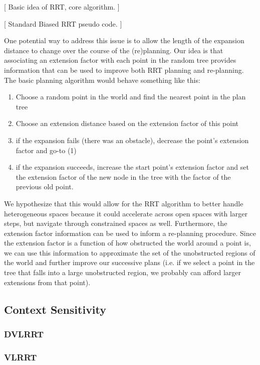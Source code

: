 \documentclass[11pt,twoside,twocolumn]{article}
\begin{document}
[ Basic idea of RRT, core algorithm. ]

[ Standard Biased RRT pseudo code. ]

One potential way to address this issue is to allow the length of the expansion distance to change over the course of the (re)planning. 
Our idea is that associating an extension factor with each point in the random tree provides information that can be used to
improve both RRT planning and re-planning. 
The basic planning algorithm would behave something like this:
\begin{enumerate}
\item Choose a random point in the world and find the nearest point in the plan tree
\item Choose an extension distance based on the extension factor of this point
\item if the expansion fails (there was an obstacle), decrease the point's extension factor and go-to (1)
\item if the expansion succeeds, increase the start point's extension factor and set the extension factor of the new node in the tree with the factor of the previous old point.
\end{enumerate}
We hypothesize that this would allow for the RRT algorithm to better handle heterogeneous spaces because it could accelerate across open spaces with larger steps, but navigate through constrained spaces as well. Furthermore, the extension factor information can be used to inform a re-planning procedure. Since the extension factor is a function of how obstructed the world
around a point is, we can use this information to approximate the set of the unobstructed regions of the world and further improve
our successive plans (i.e. if we select a point in the tree that falls into a large unobstructed region, we probably can afford larger extensions from that point).

\subsection{Context Sensitivity}

\subsubsection{DVLRRT}

\subsubsection{VLRRT}
\end{document}

